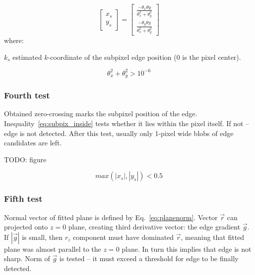 \begin{equation}
\begin{bmatrix}
x_s \\
y_s 
\end{bmatrix} = 
\begin{bmatrix}
\frac{-\theta_{x} \theta{y}}{\theta_x^2 + \theta_y^2} \\
\frac{-\theta_{y} \theta{y}}{\theta_x^2 + \theta_y^2}
\end{bmatrix}
\label{eq:zerocross}
\end{equation}
where:
\begin{eqwhere}[2cm]
	\item[$k_s$] estimated $k$-coordinate of the subpixel edge position (0 is the pixel center).
\end{eqwhere}

\begin{equation}
\theta_{x}^2 + \theta_{y}^2 > 10^{-6}
\label{eq:test3}
\end{equation}

\subsubsection{Fourth test}
\label{edge_fourth}

Obtained zero-crossing marks the subpixel position of the edge. Inequality~\ref{eq:subpix_inside} tests whether it lies within the pixel itself. If not -- edge is not detected. After this test, usually only 1-pixel wide blobs of edge candidates are left.

TODO: figure

\begin{equation}
max(|x_s|, |y_s|) < 0.5
\label{eq:subpix_inside}
\end{equation}

\subsubsection{Fifth test}
\label{edge_fith}

Normal vector of fitted plane is defined by Eq.~\ref{eq:planenorm}. Vector $\vec{r}$ can projected onto $z=0$ plane, creating third derivative vector: the edge gradient $\vec{g}$. If $|\vec{g}|$ is small, then $r_{z}$ component must have dominated $\vec{r}$, meaning that fitted plane was almost parallel to the $z=0$ plane. In turn this implies that edge is not sharp. Norm of $\vec{g}$ is tested -- it must exceed a threshold for edge to be finally detected.

